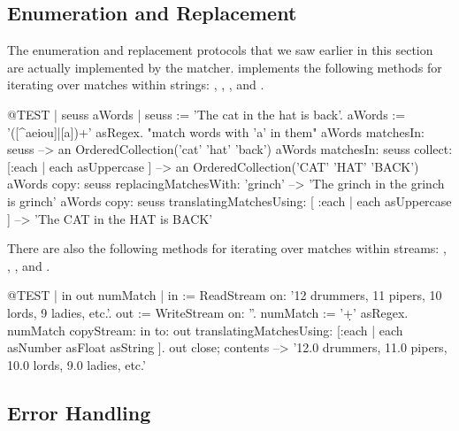 \documentclass[a4paper,10pt,twoside]{book}
\begin{document}
{\subsection{Enumeration and Replacement}

The  enumeration and replacement protocols that we saw earlier in this section are actually implemented by the matcher.
 implements the following methods for iterating over matches within strings:
,
,
,
 and
.

\begin{code}{@TEST | seuss aWords |}
seuss := 'The cat in the hat is back'.
aWords := '\<([^aeiou]|[a])+\>' asRegex.    "match words with 'a' in them"
aWords matchesIn: seuss
    --> an OrderedCollection('cat' 'hat' 'back')
aWords matchesIn: seuss collect: [:each | each asUppercase ]
    --> an OrderedCollection('CAT' 'HAT' 'BACK')
aWords copy: seuss replacingMatchesWith: 'grinch'
    --> 'The grinch in the grinch is grinch'
aWords copy: seuss translatingMatchesUsing: [ :each | each asUppercase ]
    --> 'The CAT in the HAT is BACK'
\end{code}

There are also the following methods for iterating over matches within streams:
,
,
,
 and
.

\begin{code}{@TEST | in out numMatch |}
in := ReadStream on: '12 drummers, 11 pipers, 10 lords, 9 ladies, etc.'.
out := WriteStream on: ''.
numMatch := '\<\d+\>' asRegex.
numMatch
  copyStream: in
  to: out
  translatingMatchesUsing: [:each | each asNumber asFloat asString ].
out close; contents --> '12.0 drummers, 11.0 pipers, 10.0 lords, 9.0 ladies, etc.'
\end{code}


\subsection{Error Handling}

}
\end{document}
